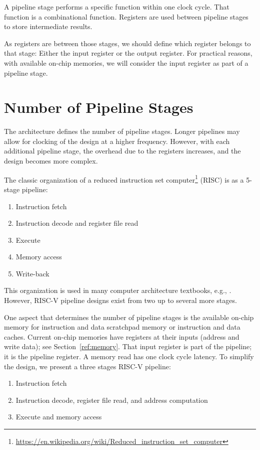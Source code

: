 \documentclass[%
    10pt,
    headinclude, footexclude,
    openright, %
    notitlepage,
    cleardoubleempty,
    headsepline,
    pointlessnumbers,
    bibtotoc, idxtotoc,
    ]{scrbook}
\newcommand{\myref}[2]{\href{#1}{#2}}
\renewcommand{\myref}[2]{{#2}{\footnote{\url{#1}}}}
\begin{document}
A pipeline stage performs a specific function within one clock cycle. That function is
a combinational function. Registers are used between pipeline stages to store intermediate
results.

As registers are between those stages, we should define which register belongs to that stage:
Either the input register or the output register. For practical reasons, with available on-chip
memories, we will consider the input register as part of a pipeline stage.

\section{Number of Pipeline Stages}

The architecture defines the number of pipeline stages. Longer pipelines may allow
for clocking of the design at a higher frequency. However, with each additional pipeline stage,
the overhead due to the registers increases, and the design becomes more complex.

The classic organization of a \myref{https://en.wikipedia.org/wiki/Reduced_instruction_set_computer}{reduced instruction set computer} (RISC) is as a 5-stage pipeline:
\begin{enumerate}
\item Instruction fetch
\item Instruction decode and register file read
\item Execute
\item Memory access
\item Write-back
\end{enumerate}

This organization is used in many computer architecture textbooks, e.g., \cite{Patterson20}.
However, RISC-V pipeline designs exist from two up to several more stages.

One aspect that determines the number of pipeline stages is the available on-chip memory
for instruction and data scratchpad memory or instruction and data caches.
Current on-chip memories have registers at their inputs (address and write data); see Section~\ref{ref:memory}. That input register is part of the pipeline; it is the
pipeline register. A memory read has one clock cycle latency.
To simplify the design, we present a three stages RISC-V pipeline:

\begin{enumerate}
\item Instruction fetch
\item Instruction decode, register file read, and address computation
\item Execute and memory access
\end{enumerate}
\end{document}
